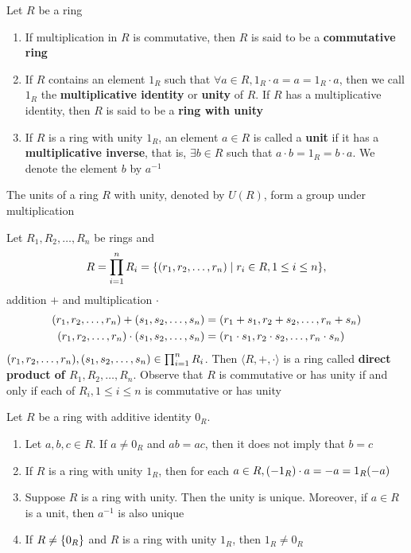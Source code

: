 \begin{definition} Let $R$ be a ring
    \begin{enumerate}
        \item If multiplication in $R$ is commutative, then $R$ is said to be a \textbf{commutative ring}
        \item If $R$ contains an element $1_R$ such that $\forall a \in R, 1_R \cdot a = a = 1_R \cdot a$, then we call $1_R$ the \textbf{multiplicative identity} or \textbf{unity} of $R$. If $R$ has a multiplicative identity, then $R$ is said to be a \textbf{ring with unity}
        \item If $R$ is a ring with unity $1_R$, an element $a \in R$ is called a \textbf{unit} if it has a \textbf{multiplicative inverse}, that is, $\exists b \in R$ such that $a \cdot b = 1_R = b \cdot a$. We denote the element $b$ by $a^{-1}$
    \end{enumerate}
\end{definition}

\begin{theorem}
    The units of a ring $R$ with unity, denoted by $U(R)$, form a group under multiplication
\end{theorem}

\begin{definition}
    Let $R_1, R_2, \ldots, R_n$ be rings and 
    \[ R = \prod_{i=1}^{n} R_i = \qty{\qty(r_1, r_2, \ldots, r_n) \mid r_i \in R, 1 \leq i \leq n}, \]
    addition $+$ and multiplication $\cdot$
    \begin{align*}
        \qty(r_1, r_2, \ldots, r_n) + \qty(s_1, s_2, \ldots, s_n) &= \qty(r_1 + s_1, r_2 + s_2, \ldots, r_n + s_n) \\
        \qty(r_1, r_2, \ldots, r_n) \cdot \qty(s_1, s_2, \ldots, s_n) &= \qty(r_1 \cdot s_1, r_2 \cdot s_2, \ldots, r_n \cdot s_n)
    \end{align*}
    $\qty(r_1, r_2, \ldots, r_n), \qty(s_1, s_2, \ldots, s_n) \in \prod_{i = 1}^{n} R_i$. Then $\langle R, +, \cdot \rangle$ is a ring called \textbf{direct product of $R_1, R_2, \ldots, R_n$}. Observe that $R$ is commutative or has unity if and only if each of $R_i, 1 \leq i \leq n$ is commutative or has unity
\end{definition}

\begin{remark}
    Let $R$ be a ring with additive identity $0_R$. \begin{enumerate}
        \item Let $a, b, c \in R$. If $a \neq 0_R$ and $ab = ac$, then it does not imply that $b = c$
        \item If $R$ is a ring with unity $1_R$, then for each $a \in R, (-1_R) \cdot a = -a = 1_R \qty(-a)$
        \item Suppose $R$ is a ring with unity. Then the unity is unique. Moreover, if $a \in R$ is a unit, then $a^{-1}$ is also unique
        \item If $R \neq \qty{0_R}$ and $R$ is a ring with unity $1_R$, then $1_R \neq 0_R$
    \end{enumerate}
\end{remark}

